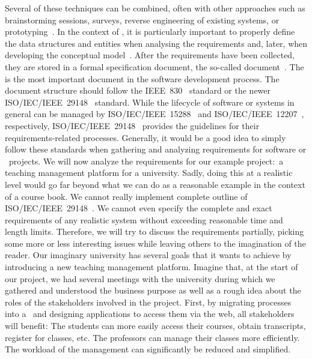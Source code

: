 Several of these techniques can be combined, often with other approaches such as brainstorming sessions, surveys, reverse engineering of existing systems, or prototyping~\cite{I2018SAH,S2003ISA6P:RDARS}.
In the context of , it is particularly important to properly define the data structures and entities when analysing the requirements and, later, when developing the conceptual model~\cite{M1987DFADSMFDRACS}.%
%
\endhsection%
%
%
After the requirements have been collected, they are stored in a formal specification document, the so-called  document~\cite{S2010DSRSAR,W2004ASOTMFMTQOTRSD}.
The  is the most important document in the software development process.
The document structure should follow the IEEE~830~\cite{IEEE1998IRPFSRS} standard or the newer ISO/IEC/IEEE~29148~\cite{ISOIECIEEE2018SASELCPRE} standard.
While the lifecycle of software or systems in general can be managed by ISO/IEC/IEEE~15288~\cite{ISOIECIEEE2023SASESLCP} and ISO/IEC/IEEE~12207~\cite{ISOIECIEEE2017SASESLCP}, respectively, ISO/IEC/IEEE~29148~\cite{ISOIECIEEE2018SASELCPRE} provides the guidelines for their requirements-related processes.
Generally, it would be a good idea to simply follow these standards when gathering and analyzing requirements for software or \db\ projects.%
\endhsection%
%
%
%
We will now analyze the requirements for our example project:~a teaching management platform for a university.
Sadly, doing this at a realistic level would go far beyond what we can do as a reasonable example in the context of a course book.
We cannot really implement complete outline of ISO/IEC/IEEE~29148~\cite{ISOIECIEEE2018SASELCPRE}.
We cannot even specify the complete and exact requirements of any realistic system without exceeding reasonable time and length limits.
Therefore, we will try to discuss the requirements partially, picking some more or less interesting issues while leaving others to the imagination of the reader.%
%
%
%
Our imaginary university has several goals that it wants to achieve by introducing a new teaching management platform.
Imagine that, at the start of our project, we had several meetings with the university during which we gathered and understood the business purpose as well as a rough idea about the roles of the stakeholders involved in the project.
%
%
First, by migrating processes into a \db\ and designing applications to access them via the web, all stakeholders will benefit:
The students can more easily access their courses, obtain transcripts, register for classes, etc.
The professors can manage their classes more efficiently.
The workload of the management can significantly be reduced and simplified.

